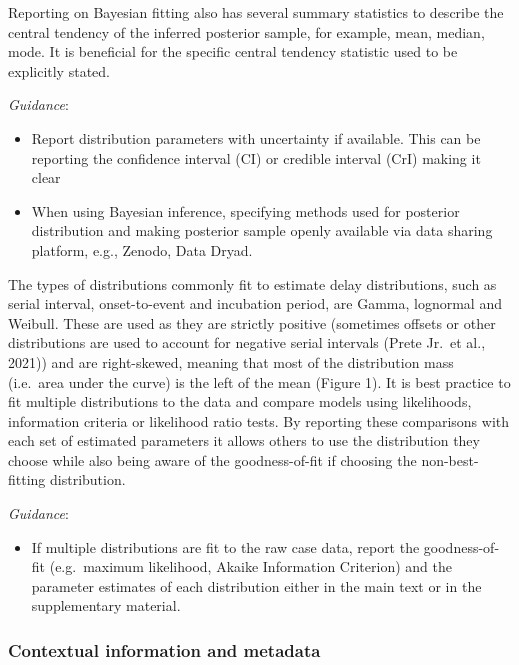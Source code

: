 \documentclass[
  10pt,
  letterpaper,
]{article}
\providecommand{\tightlist}{%
  \setlength{\itemsep}{0pt}\setlength{\parskip}{0pt}}\usepackage{longtable,booktabs,array}
\begin{document}
Reporting on Bayesian fitting also has several summary statistics to
describe the central tendency of the inferred posterior sample, for
example, mean, median, mode. It is beneficial for the specific central
tendency statistic used to be explicitly stated.

\emph{Guidance}:

\begin{itemize}
\tightlist
\item
  Report distribution parameters with uncertainty if available. This can
  be reporting the confidence interval (CI) or credible interval (CrI)
  making it clear
\item
  When using Bayesian inference, specifying methods used for posterior
  distribution and making posterior sample openly available via data
  sharing platform, e.g., Zenodo, Data Dryad.
\end{itemize}

The types of distributions commonly fit to estimate delay distributions,
such as serial interval, onset-to-event and incubation period, are
Gamma, lognormal and Weibull. These are used as they are strictly
positive (sometimes offsets or other distributions are used to account
for negative serial intervals (Prete Jr.~et al., 2021)) and are
right-skewed, meaning that most of the distribution mass (i.e.~area
under the curve) is the left of the mean (Figure 1). It is best practice
to fit multiple distributions to the data and compare models using
likelihoods, information criteria or likelihood ratio tests. By
reporting these comparisons with each set of estimated parameters it
allows others to use the distribution they choose while also being aware
of the goodness-of-fit if choosing the non-best-fitting distribution.

\emph{Guidance}:

\begin{itemize}
\tightlist
\item
  If multiple distributions are fit to the raw case data, report the
  goodness-of-fit (e.g.~maximum likelihood, Akaike Information
  Criterion) and the parameter estimates of each distribution either in
  the main text or in the supplementary material.
\end{itemize}

\subsubsection{Contextual information and
metadata}\label{contextual-information-and-metadata}
\end{document}

